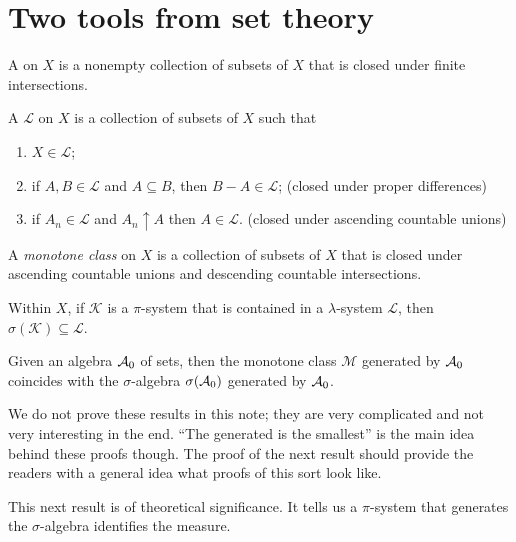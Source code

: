 \section{Two tools from set theory}
\begin{defn}
A  on $X$ is a nonempty collection of subsets of $X$ that is closed under finite intersections.

A  $\mathcal{L}$ on $X$ is a collection of subsets of $X$ such that 
\begin{enumerate}
    \item $X\in\mathcal{L}$; 
    \item \label{enu:prop-diff-lam-sys} if $A,B\in\mathcal{L}$ and $A\subseteq B$, then $B-A\in\mathcal{L}$; (closed under proper differences)
    \item if $A_{n}\in\mathcal{L}$ and $A_{n}\uparrow A$ then $A\in\mathcal{L}$. (closed under ascending countable unions)
\end{enumerate}
\end{defn}
\begin{defn}
    A \emph{monotone class} on $X$ is a collection of subsets of $X$ that is closed under ascending countable unions and descending countable intersections.
    
\end{defn}
\begin{namedthm} \label{thm:pi-lambda}
     Within $X$, if $\mathcal{K}$ is a $\pi$-system that is contained in a $\lambda$-system $\mathcal{L}$, then $\sigma(\mathcal{K})\subseteq\mathcal{L}$.
\end{namedthm}
\begin{namedthm} \label{thm:monotone-class}
     Given an algebra $\mathcal{A}_0$ of sets, then the monotone class $\mathcal{M}$ generated by $\mathcal{A}_0$ coincides with the $\sigma$-algebra $\sigma(\mathcal{A}_0)$ generated by $\mathcal{A}_0$.
\end{namedthm}

We do not prove these results in this note; they are very complicated and not very interesting in the end. ``The generated is the smallest'' is the main idea behind these proofs though. The proof of the next result should provide the readers with a general idea what proofs of this sort look like.

This next result is of theoretical significance. It tells us a $\pi$-system that generates the $\sigma$-algebra identifies the measure. 

